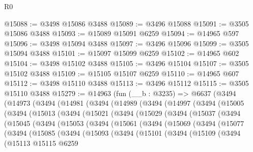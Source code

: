 \begin{lexlean}{R0}
\begin{coremodule}
@15088 := @3498 @15086 @3488
@15089 := @3496 @15088
@15091 := @3505 @15086 @3488
@15093 := @15089 @15091 @6259
@15094 := @14965 @597
@15096 := @3498 @15094 @3488
@15097 := @3496 @15096
@15099 := @3505 @15094 @3488
@15101 := @15097 @15099 @6259
@15102 := @14965 @602
@15104 := @3498 @15102 @3488
@15105 := @3496 @15104
@15107 := @3505 @15102 @3488
@15109 := @15105 @15107 @6259
@15110 := @14965 @607
@15112 := @3498 @15110 @3488
@15113 := @3496 @15112
@15115 := @3505 @15110 @3488
@15279 := @14963
    (fun (__b : @3235) =>
    @6637
      (@3494
        (@14973
          (@3494
            (@14981
              (@3494
                (@14989
                  (@3494
                    (@14997
                      (@3494
                        (@15005
                          (@3494
                            (@15013
                              (@3494
                                (@15021
                                  (@3494
                                    (@15029
                                      (@3494
                                        (@15037
                                          (@3494
                                            (@15045
                                              (@3494
                                                (@15053
                                                  (@3494
                                                    (@15061
                                                      (@3494
                                                        (@15069
                                                          (@3494
                                                            (@15077
                                                              (@3494
                                                                (@15085
                                                                  (@3494
                                                                    (@15093
                                                                      (@3494
                                                                        (@15101
                                                                          (@3494
                                                                            (@15109
                                                                              (@3494
                                                                                (@15113
                                                                                  @15115
                                                                                  @6259

\end{coremodule}
\end{lexlean}
